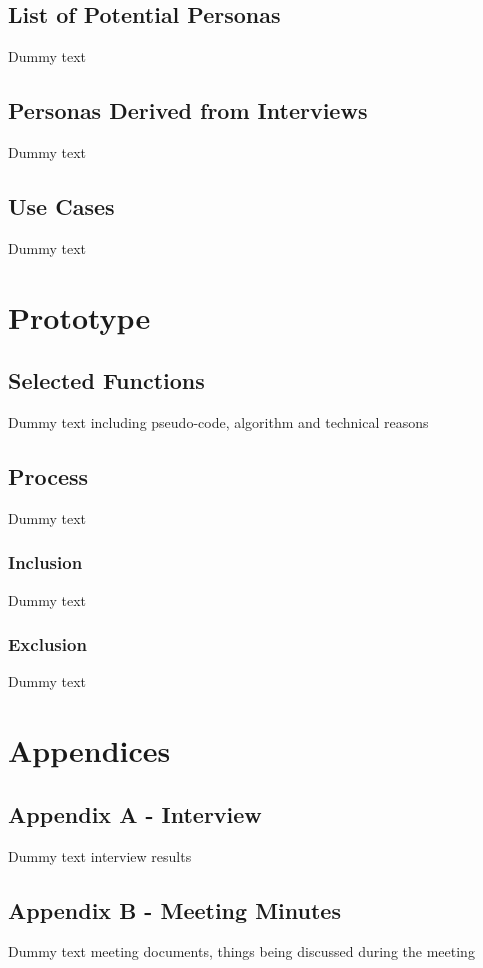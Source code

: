 \documentclass[12pt]{article}
\begin{document}
\newpage
\subsection{List of Potential Personas}
Dummy text

\subsection{Personas Derived from Interviews}
Dummy text

\subsection{Use Cases}
Dummy text

\section{Prototype}

\subsection{Selected Functions}
Dummy text
including pseudo-code, algorithm and technical reasons

\subsection{Process}
Dummy text

\subsubsection{Inclusion}
Dummy text

\subsubsection{Exclusion}
Dummy text


\section{Appendices}
\subsection{Appendix A - Interview  }
Dummy text
interview results

\subsection{Appendix B - Meeting Minutes}
Dummy text
meeting documents, things being discussed during the meeting
\end{document}
